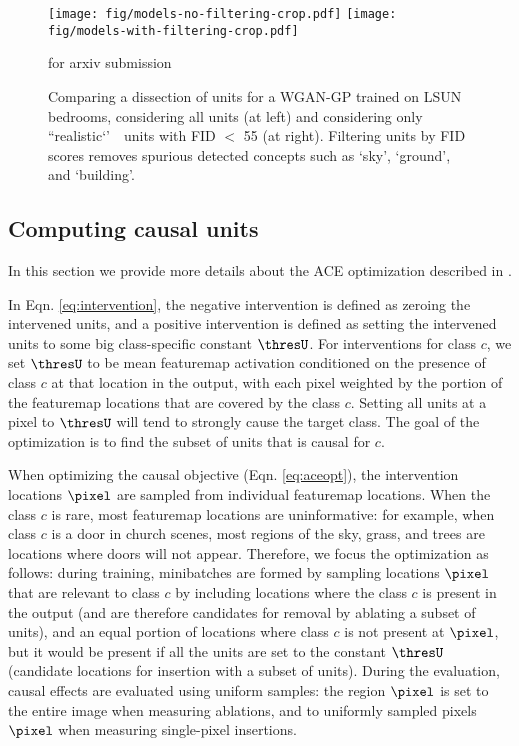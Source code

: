 \documentclass{article} %
\def\arxiv{for arxiv submission}
\begin{document}
\begin{figure}
\centering
\texttt{[image: fig/models-no-filtering-crop.pdf]}
\hspace{0.2in}
\texttt{[image: fig/models-with-filtering-crop.pdf]}
\caption{Comparing a dissection of units for a WGAN-GP trained on LSUN bedrooms, considering all units (at left) and considering only ``realistic‘’　units with FID $<$ 55 (at right).  Filtering units by FID scores removes spurious detected concepts such as `sky', `ground', and `building'.}
\ifdefined\arxiv\else
\vspace{-3pt}
\fi\end{figure}\subsection{Computing causal units}
In this section we provide more details about the ACE optimization
described in .

  In Eqn. \ref{eq:intervention}, the negative intervention is defined as zeroing the intervened units, and a positive intervention is defined as setting the intervened units to some big class-specific constant $\thresU$.  For interventions for class $c$, we set $\thresU$ to be mean featuremap activation conditioned on the presence of class $c$ at that location in the output, with each pixel weighted by the portion of the featuremap locations that are covered by the class $c$.   Setting all units at a pixel to $\thresU$ will tend to strongly cause the target class. The goal of the optimization is to find the subset of units that is causal for $c$.

  When optimizing the causal objective (Eqn. \ref{eq:aceopt}), the intervention locations $\pixel$ are sampled from individual featuremap locations. When the class $c$ is rare, most featuremap locations are uninformative: for example, when class $c$ is a door in church scenes, most regions of the sky, grass, and trees are locations where doors will not appear.  Therefore, we focus the optimization as follows: during training, minibatches are formed by sampling locations $\pixel$ that are relevant to class $c$ by including locations where the class $c$ is present in the output (and are therefore candidates for removal by ablating a subset of units), and an equal portion of locations where class $c$ is not present at $\pixel$, but it would be present if all the units are set to the constant $\thresU$ (candidate locations for insertion with a subset of units).  During the evaluation, causal effects are evaluated using uniform samples: the region $\pixel$ is set to the entire image when measuring ablations, and to uniformly sampled pixels $\pixel$ when measuring single-pixel insertions.
\end{document}
